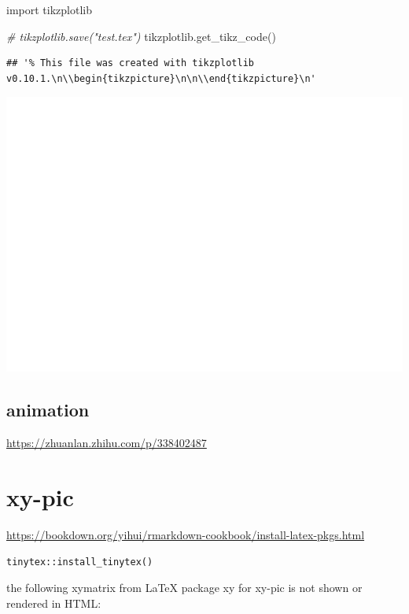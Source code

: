 \documentclass[
]{book}
\newenvironment{Shaded}{\begin{snugshade}}{\end{snugshade}}
\newcommand{\CommentTok}[1]{\textcolor[rgb]{0.56,0.35,0.01}{\textit{#1}}}
\newcommand{\ImportTok}[1]{#1}
\newcommand{\NormalTok}[1]{#1}
\theoremstyle{definition}
\theoremstyle{definition}
\theoremstyle{definition}
\theoremstyle{definition}
\theoremstyle{remark}
\begin{document}
\begin{Shaded}
\begin{Highlighting}[]
\ImportTok{import}\NormalTok{ tikzplotlib}

\CommentTok{\# tikzplotlib.save("test.tex")}
\NormalTok{tikzplotlib.get\_tikz\_code()}
\end{Highlighting}
\end{Shaded}

\begin{verbatim}
## '% This file was created with tikzplotlib v0.10.1.\n\\begin{tikzpicture}\n\n\\end{tikzpicture}\n'
\end{verbatim}

\includegraphics{202401311000-TikZ_files/figure-latex/unnamed-chunk-170-6}

\section{animation}\label{animation}

\url{https://zhuanlan.zhihu.com/p/338402487}

\chapter{xy-pic}\label{xy-pic}

\url{https://bookdown.org/yihui/rmarkdown-cookbook/install-latex-pkgs.html}

\texttt{tinytex::install\_tinytex()}

the following xymatrix from LaTeX package xy for xy-pic is not shown or rendered in HTML:
\end{document}
